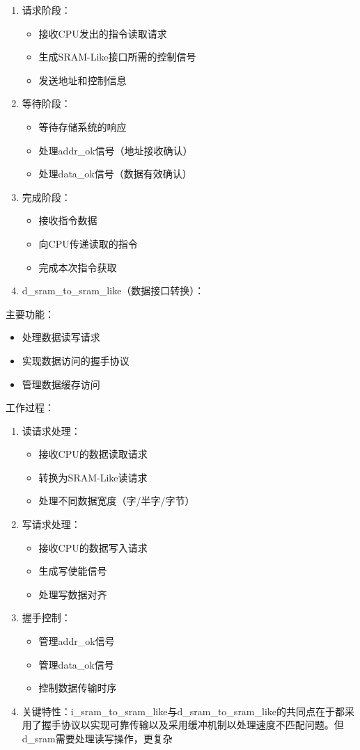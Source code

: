 \begin{enumerate}
\item 请求阶段：
\begin{itemize}
	\item 接收CPU发出的指令读取请求
	\item 生成SRAM-Like接口所需的控制信号
	\item 发送地址和控制信息
\end{itemize}
\item 等待阶段：
\begin{itemize}
	\item 等待存储系统的响应
	\item 处理addr\_ok信号（地址接收确认）
	\item 处理data\_ok信号（数据有效确认）
\end{itemize}
\item 完成阶段：
\begin{itemize}
	\item 接收指令数据
	\item 向CPU传递读取的指令
	\item 完成本次指令获取
\end{itemize}
\item d\_sram\_to\_sram\_like（数据接口转换）：
\end{enumerate}
主要功能：

\begin{itemize}
\item 处理数据读写请求
\item 实现数据访问的握手协议
\item 管理数据缓存访问
\end{itemize}
工作过程：

\begin{enumerate}
\item 读请求处理：
\begin{itemize}
	\item 接收CPU的数据读取请求
	\item 转换为SRAM-Like读请求
	\item 处理不同数据宽度（字/半字/字节）
\end{itemize}
\item 写请求处理：
\begin{itemize}
	\item 接收CPU的数据写入请求
	\item 生成写使能信号
	\item 处理写数据对齐
\end{itemize}
\item 握手控制：
\begin{itemize}
	\item 管理addr\_ok信号
	\item 管理data\_ok信号
	\item 控制数据传输时序
\end{itemize}
\item 关键特性：i\_sram\_to\_sram\_like与d\_sram\_to\_sram\_like的共同点在于都采用了握手协议以实现可靠传输以及采用缓冲机制以处理速度不匹配问题。但d\_sram需要处理读写操作，更复杂
\end{enumerate}

